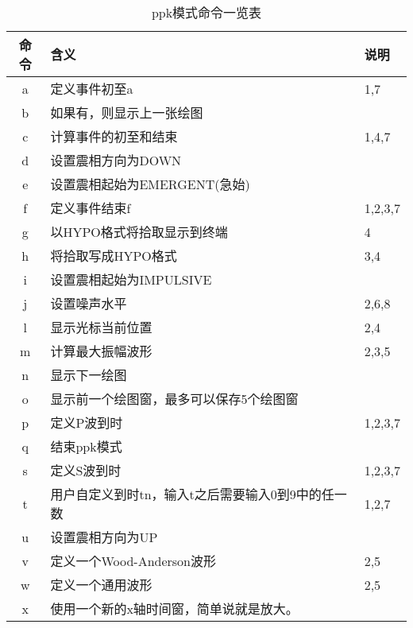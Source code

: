 \begin{table}[H]
\centering
\small
\ttfamily
\caption{ppk模式命令一览表}
\label{table:plotpk-commands}
\begin{tabular}{cll}
	\toprule
    命令	&	含义	                                &   说明    \\
	\midrule
    a	    &	定义事件初至a                           &   1,7	    \\
    b	    &	如果有，则显示上一张绘图	            &           \\
    c	    &	计算事件的初至和结束                    &   1,4,7	\\
    d	    &	设置震相方向为DOWN	                    &           \\
    e     	&	设置震相起始为EMERGENT(急始)	        &           \\
    f	    &	定义事件结束f                           &  1,2,3,7	\\
    g	    &	以HYPO格式将拾取显示到终端              &   4   	\\
    h   	&	将拾取写成HYPO格式                      &   3,4 	\\
    i	    &	设置震相起始为IMPULSIVE	                &           \\
    j	    &	设置噪声水平                            &   2,6,8	\\
    l	    &	显示光标当前位置                        &   2,4	    \\
    m	    &	计算最大振幅波形                        &   2,3,5	\\
    n	    &	显示下一绘图	                        &           \\
    o	    &	显示前一个绘图窗，最多可以保存5个绘图窗	&           \\
    p	    &	定义P波到时                             &   1,2,3,7	\\
    q	    &	结束ppk模式	                            &           \\
    s	    &	定义S波到时                             &   1,2,3,7 \\
    t	    &	用户自定义到时tn，输入t之后需要输入0到9中的任一数	&   1,2,7\\
    u	    &	设置震相方向为UP	                    &           \\
    v	    &	定义一个Wood-Anderson波形               &   2,5 	\\
    w	    &	定义一个通用波形                        &   2,5 	\\
    x	    &	使用一个新的x轴时间窗，简单说就是放大。 &           \\

\end{tabular}
\end{table}
